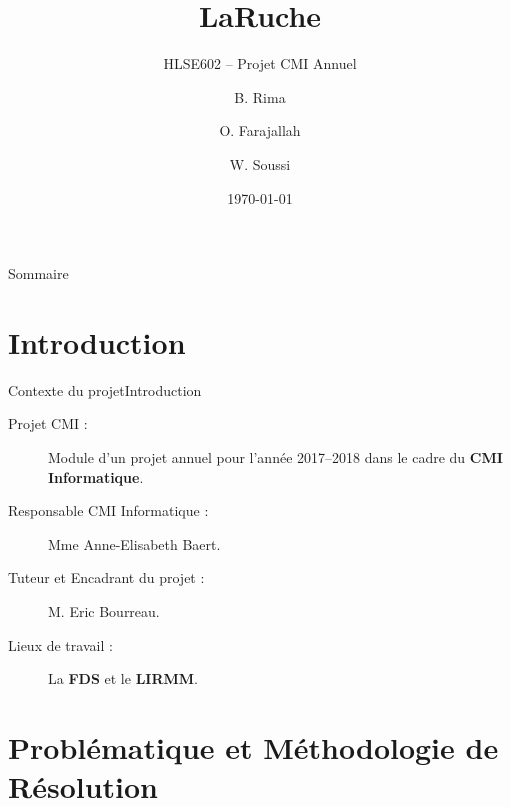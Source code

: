 \documentclass[usenames,dvipsnames]{beamer}
\title{LaRuche}
\subtitle{HLSE602 -- Projet CMI Annuel}
\author{B. Rima \and O. Farajallah \and W. Soussi}
\institute[UM]{L3 CMI Informatique}
\date{\today}
\begin{document}
\begin{frame}
\titlepage
\end{frame}
\begin{frame}{Sommaire}
\tableofcontents
\end{frame}
\section{Introduction}
\begin{frame}{Contexte du projet}{Introduction}
  \begin{description}
    \item [Projet CMI :] Module d'un projet annuel pour l'année 2017--2018 dans le cadre du \textbf{CMI Informatique}.
    \item [Responsable CMI Informatique :] Mme Anne-Elisabeth Baert.
    \item [Tuteur et Encadrant du projet :] M. Eric Bourreau.
    \item [Lieux de travail :] La \textbf{FDS} et le \textbf{LIRMM}.
  \end{description}
\end{frame}

\section{Problématique et Méthodologie de Résolution}
\end{document}
